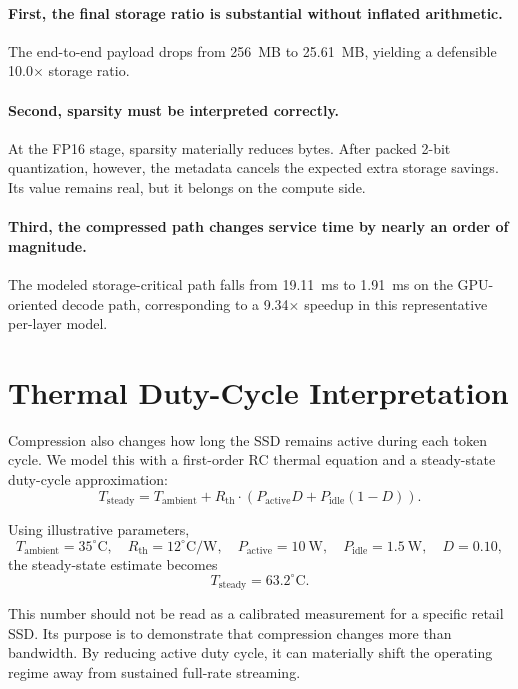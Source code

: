 \documentclass[11pt]{article}
\begin{document}
\paragraph{First, the final storage ratio is substantial without inflated arithmetic.}
The end-to-end payload drops from 256~MB to 25.61~MB, yielding a defensible 10.0$\times$ storage ratio.

\paragraph{Second, sparsity must be interpreted correctly.}
At the FP16 stage, sparsity materially reduces bytes. After packed 2-bit quantization, however, the metadata cancels the expected extra storage savings. Its value remains real, but it belongs on the compute side.

\paragraph{Third, the compressed path changes service time by nearly an order of magnitude.}
The modeled storage-critical path falls from 19.11~ms to 1.91~ms on the GPU-oriented decode path, corresponding to a 9.34$\times$ speedup in this representative per-layer model.

\section{Thermal Duty-Cycle Interpretation}
Compression also changes how long the SSD remains active during each token cycle. We model this with a first-order RC thermal equation and a steady-state duty-cycle approximation:
\begin{equation}
T_{\text{steady}} = T_{\text{ambient}} + R_{\text{th}} \cdot \left(P_{\text{active}} D + P_{\text{idle}} (1-D)\right).
\end{equation}

Using illustrative parameters,
\[
T_{\text{ambient}} = 35^\circ\mathrm{C}, \quad
R_{\text{th}} = 12^\circ\mathrm{C}/\mathrm{W}, \quad
P_{\text{active}} = 10\ \mathrm{W}, \quad
P_{\text{idle}} = 1.5\ \mathrm{W}, \quad
D = 0.10,
\]
the steady-state estimate becomes
\[
T_{\text{steady}} = 63.2^\circ\mathrm{C}.
\]

This number should not be read as a calibrated measurement for a specific retail SSD. Its purpose is to demonstrate that compression changes more than bandwidth. By reducing active duty cycle, it can materially shift the operating regime away from sustained full-rate streaming.
\end{document}
